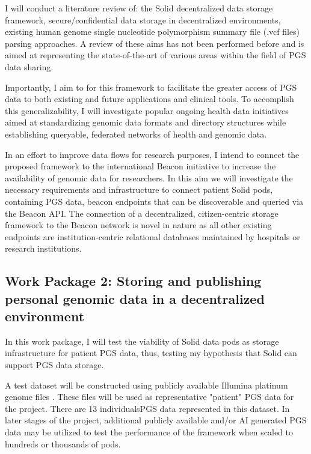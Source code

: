 \documentclass[runningheads]{llncs}
\begin{document}
I will conduct a literature review of: the Solid decentralized data storage framework, secure/confidential data storage in decentralized environments, existing human genome single nucleotide polymorphism summary file (.vcf files) parsing approaches. A review of these aims has not been performed before and is aimed at representing the state-of-the-art of various areas within the field of PGS data sharing.

Importantly, I aim to for this framework to facilitate the greater access of PGS data to both existing and future applications and clinical tools. 
To accomplish this generalizability, I will investigate popular ongoing health data initiatives aimed at standardizing genomic data formats and directory structures while establishing queryable, federated networks of health and genomic data.

In an effort to improve data flows for research purposes, I intend to connect the proposed framework to the international Beacon initiative \cite{rambla_beacon_2022} to increase the availability of genomic data for researchers. 
In this aim we will investigate the necessary requirements and infrastructure to connect patient Solid pods, containing PGS data, beacon endpoints that can be discoverable and queried via the Beacon API. The connection of a decentralized, citizen-centric storage framework to the Beacon network is novel in nature as all other existing endpoints are institution-centric relational databases maintained by hospitals or research institutions.


\subsection{Work Package 2: Storing and publishing personal genomic data in a decentralized environment} 

In this work package, I will test the viability of Solid data pods as storage infrastructure for patient PGS data, thus, testing my hypothesis that Solid can support PGS data storage. 

A test dataset will be constructed using publicly available Illumina platinum genome files \cite{noauthor_platinum_nodate}. 
These files will be used as representative "patient" PGS data for the project. 
There are 13 individuals\textquotesingle  PGS data represented in this dataset. 
In later stages of the project, additional publicly available and/or AI generated PGS data may be utilized to test the performance of the framework when scaled to hundreds or thousands of pods. 
\end{document}
